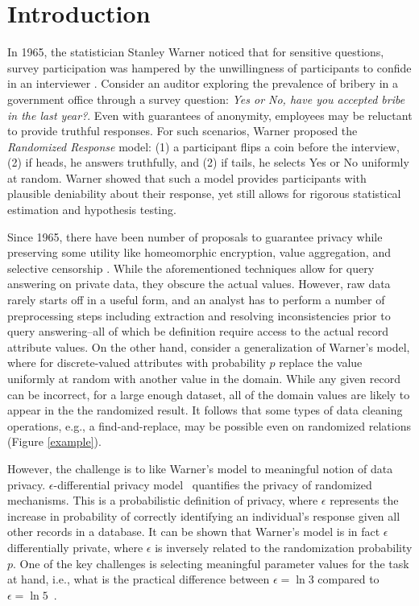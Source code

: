 \section{Introduction}
In 1965, the statistician Stanley Warner noticed that for sensitive questions, survey participation was hampered by the unwillingness of participants to confide in an interviewer \cite{warner1965randomized}.
Consider an auditor exploring the prevalence of bribery in a government office through a survey question: \emph{Yes or No, have you accepted bribe in the last year?}. 
Even with guarantees of anonymity, employees may be reluctant to provide truthful responses.
For such scenarios, Warner proposed the \emph{Randomized Response} model: (1) a participant flips a coin before the interview, (2) if heads, he answers truthfully, and (2) if tails, he selects Yes or No uniformly at random.
Warner showed that such a model provides participants with plausible deniability about their response, yet still allows for rigorous statistical estimation and hypothesis testing.

Since 1965, there have been number of proposals to guarantee privacy while preserving some utility like homeomorphic encryption, value aggregation, and selective censorship \cite{sweeney2002achieving, machanavajjhala2007diversity, li2007t}.
While the aforementioned techniques allow for query answering on private data, they obscure the actual values.
However, raw data rarely starts off in a useful form, and an analyst has to perform a number of preprocessing steps including extraction and resolving inconsistencies prior to query answering--all of which be definition require access to the actual record attribute values.
On the other hand, consider a generalization of Warner's model, where for discrete-valued attributes with probability $p$ replace the value uniformly at random with another value in the domain.   
While any given record can be incorrect, for a large enough dataset, all of the domain values are likely to appear in the the randomized result.
It follows that some types of data cleaning operations, e.g., a find-and-replace, may be possible even on randomized relations (Figure \ref{example}).

However, the challenge is to like Warner's model to meaningful notion of data privacy.
$\epsilon$-differential privacy model~\cite{dwork2011differential} quantifies the privacy of randomized mechanisms.
This is a probabilistic definition of privacy, where $\epsilon$ represents the increase in probability of correctly identifying an individual's response given all other records in a database.
It can be shown that Warner's model is in fact $\epsilon$ differentially private, where $\epsilon$ is inversely related to the randomization probability $p$.
One of the key challenges is selecting meaningful parameter values for the task at hand, i.e., what is the practical difference between $\epsilon = \ln 3$ compared to $\epsilon = \ln 5$~\cite{DBLP:conf/sigmod/YangZMWX12}.


